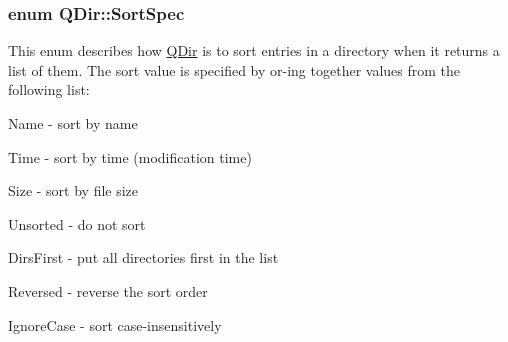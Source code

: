 \subsubsection[{Sort\+Spec}]{\setlength{\rightskip}{0pt plus 5cm}enum {\bf Q\+Dir\+::\+Sort\+Spec}}\label{class_q_dir_a428a858abe9593efc498b6641b41994c}
This enum describes how \hyperlink{class_q_dir}{Q\+Dir} is to sort entries in a directory when it returns a list of them. The sort value is specified by or-\/ing together values from the following list\+: 
\begin{DoxyItemize}
\item {\ttfamily Name} -\/ sort by name 
\item {\ttfamily Time} -\/ sort by time (modification time) 
\item {\ttfamily Size} -\/ sort by file size 
\item {\ttfamily Unsorted} -\/ do not sort


\item {\ttfamily Dirs\+First} -\/ put all directories first in the list 
\item {\ttfamily Reversed} -\/ reverse the sort order 
\item {\ttfamily Ignore\+Case} -\/ sort case-\/insensitively


\end{DoxyItemize}

